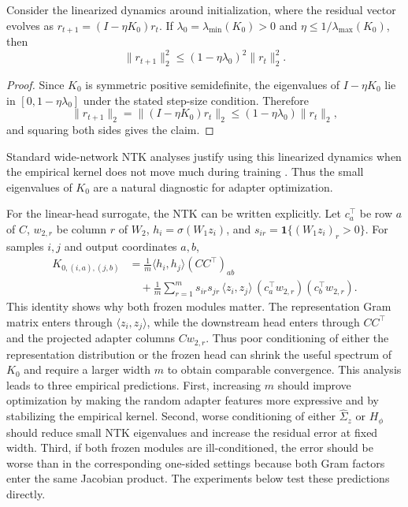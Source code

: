 \documentclass[10pt,a4paper]{article}
\begin{document}
\begin{proposition}
Consider the linearized dynamics around initialization, where the residual vector evolves as
$r_{t+1}=(I-\eta K_0)r_t$.  If $\lambda_0=\lambda_{\min}(K_0)>0$ and
$\eta\le 1/\lambda_{\max}(K_0)$, then
\[
    \|r_{t+1}\|_2^2 \le (1-\eta\lambda_0)^2\|r_t\|_2^2 .
\]
\end{proposition}

\begin{proof}
Since $K_0$ is symmetric positive semidefinite, the eigenvalues of $I-\eta K_0$ lie in
$[0,1-\eta\lambda_0]$ under the stated step-size condition.  Therefore
\[
    \|r_{t+1}\|_2=\|(I-\eta K_0)r_t\|_2
    \le (1-\eta\lambda_0)\|r_t\|_2,
\]
and squaring both sides gives the claim.
\end{proof}

Standard wide-network NTK analyses justify using this linearized dynamics when the empirical kernel
does not move much during training \citep{jacot2018,du2019}.  Thus the small eigenvalues of $K_0$ are a
natural diagnostic for adapter optimization.

For the linear-head surrogate, the NTK can be written explicitly.  Let $c_a^\top$ be row $a$ of $C$,
$w_{2,r}$ be column $r$ of $W_2$, $h_i=\sigma(W_1z_i)$, and
$s_{ir}=\mathbf{1}\{(W_1z_i)_r>0\}$.  For samples $i,j$ and output coordinates $a,b$,
\[
\begin{aligned}
K_{0,(i,a),(j,b)}
&= \frac1m \langle h_i,h_j\rangle (CC^\top)_{ab}  \\
&\quad + \frac1m \sum_{r=1}^m s_{ir}s_{jr}\,
        \langle z_i,z_j\rangle\,
        (c_a^\top w_{2,r})(c_b^\top w_{2,r}).
\end{aligned}
\]
This identity shows why both frozen modules matter.  The representation Gram matrix enters through
$\langle z_i,z_j\rangle$, while the downstream head enters through $CC^\top$ and the projected adapter
columns $Cw_{2,r}$.  Thus poor conditioning of either the representation distribution or the frozen head
can shrink the useful spectrum of $K_0$ and require a larger width $m$ to obtain comparable convergence.
This analysis leads to three empirical predictions.  First, increasing $m$ should improve optimization by
making the random adapter features more expressive and by stabilizing the empirical kernel.  Second,
worse conditioning of either $\widehat\Sigma_z$ or $H_\phi$ should reduce small NTK eigenvalues and
increase the residual error at fixed width.  Third, if both frozen modules are ill-conditioned, the error
should be worse than in the corresponding one-sided settings because both Gram factors enter the same
Jacobian product.  The experiments below test these predictions directly.
\end{document}
